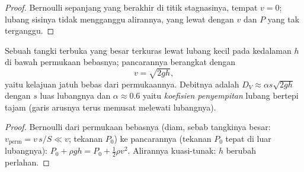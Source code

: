 \begin{proof}
Bernoulli sepanjang  yang berakhir di titik stagnasinya, tempat
$v = 0$; lubang sisinya tidak mengganggu alirannya, yang lewat dengan $v$
dan $P$ yang tak terganggu.
\end{proof}

\begin{proposition}\label{prop:b2:euler-bernoulli:torricelli}
Sebuah tangki terbuka yang besar terkuras lewat lubang kecil pada
kedalaman $h$ di bawah permukaan bebasnya; pancarannya berangkat dengan
\[
v = \sqrt{2gh} ,
\]
yaitu kelajuan jatuh bebas dari permukaannya. Debitnya adalah $D_V \approx
\alpha s\sqrt{2gh}$ dengan $s$ luas lubangnya dan $\alpha \approx 0.6$ yaitu
\emph{koefisien penyempitan} lubang bertepi tajam (garis arusnya
terus memusat melewati lubangnya).
\end{proposition}

\begin{proof}
Bernoulli dari permukaan bebasnya (diam, sebab tangkinya besar:
$v_{\text{perm}} = v\,s/S \ll v$; tekanan $P_0$) ke pancarannya (tekanan $P_0$
tepat di luar lubangnya): $P_0 + \rho gh = P_0 + \tfrac12\rho v^2$. Alirannya
kuasi-tunak: $h$ berubah perlahan.
\end{proof}

